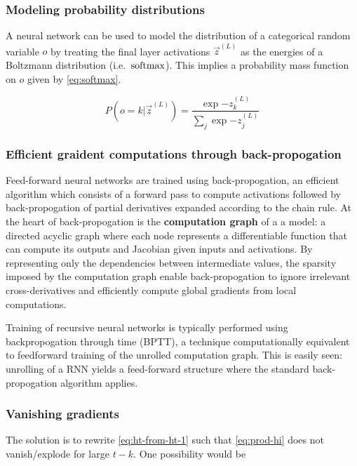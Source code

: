 \documentclass[dissertation.tex]{subfile}
\begin{document}
\subsubsection{Modeling probability distributions}

A neural network can be used to model the distribution of a categorical random
variable $o$ by treating the final layer activations $\vec{z}^{(L)}$ as the
energies of a Boltzmann distribution (i.e.\ $\operatorname*{softmax}$). This implies a
probability mass function on $o$ given by \autoref{eq:softmax}.

\begin{equation}
    \label{eq:softmax}
    P(o = k | \vec{z}^{(L)}) = \frac{\exp{-z^{(L)}_k}}{ \sum_{j} \exp{-z^{(L)}_j} }
\end{equation}

\subsubsection{Efficient graident computations through back-propogation}

Feed-forward neural networks are trained using back-propogation, an efficient
algorithm which consists of a forward pass to compute activations followed by
back-propogation of partial derivatives expanded according to the chain
rule. At the heart of back-propogation is the
\textbf{computation graph} of a a model: a directed acyclic graph where each
node represents a differentiable function that can compute its outputs and
Jacobian given inputs and activations. By representing only
the dependencies between intermediate values, the sparsity imposed by the
computation graph enable back-propogation to ignore irrelevant
cross-derivatives and efficiently compute global gradients from local
computations.


Training of recursive neural networks is typically performed using
backpropogation through time (BPTT)\cite{At}, a technique computationally
equivalent to feedforward training of the unrolled computation graph. This is
easily seen: unrolling of a RNN yields a feed-forward structure where the
standard back-propogation algorithm applies.




\subsubsection{Vanishing gradients}

The solution is to rewrite \autoref{eq:ht-from-ht-1} such that
\autoref{eq:prod-hi} does not vanish/explode for large $t - k$.
One possibility would be
\end{document}
